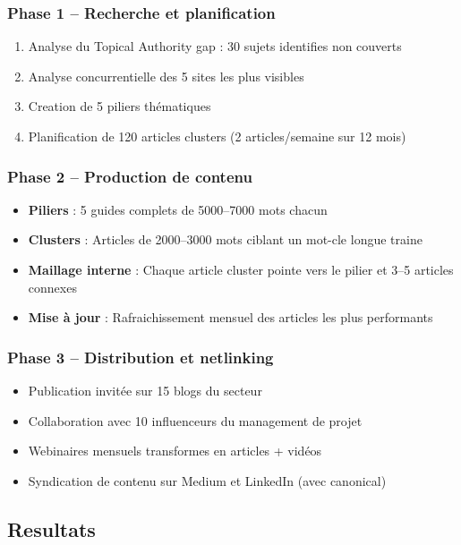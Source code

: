 \subsubsection{Phase 1 -- Recherche et planification}
\begin{enumerate}
    \item Analyse du Topical Authority gap : 30 sujets identifies non couverts
    \item Analyse concurrentielle des 5 sites les plus visibles
    \item Creation de 5 piliers thématiques
    \item Planification de 120 articles clusters (2 articles/semaine sur 12 mois)
\end{enumerate}

\subsubsection{Phase 2 -- Production de contenu}
\begin{itemize}
    \item \textbf{Piliers} : 5 guides complets de 5000--7000 mots chacun
    \item \textbf{Clusters} : Articles de 2000--3000 mots ciblant un mot-cle longue traine
    \item \textbf{Maillage interne} : Chaque article cluster pointe vers le pilier et 3--5 articles connexes
    \item \textbf{Mise à jour} : Rafraichissement mensuel des articles les plus performants
\end{itemize}

\subsubsection{Phase 3 -- Distribution et netlinking}
\begin{itemize}
    \item Publication invitée sur 15 blogs du secteur
    \item Collaboration avec 10 influenceurs du management de projet
    \item Webinaires mensuels transformes en articles + vidéos
    \item Syndication de contenu sur Medium et LinkedIn (avec canonical)
\end{itemize}

\subsection{Resultats}

